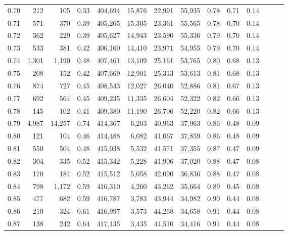 \begin{tabular}{rrrrrrrrrrrrrr}
0.70 &     212 &     105 &  0.33 &  404,694 &   15,876 &  22,991 &  55,935 &  0.78 &  0.71 &      0.14 \\
0.71 &     571 &     370 &  0.39 &  405,265 &   15,305 &  23,361 &  55,565 &  0.78 &  0.70 &      0.14 \\
0.72 &     362 &     229 &  0.39 &  405,627 &   14,943 &  23,590 &  55,336 &  0.79 &  0.70 &      0.14 \\
0.73 &     533 &     381 &  0.42 &  406,160 &   14,410 &  23,971 &  54,955 &  0.79 &  0.70 &      0.14 \\
0.74 &   1,301 &   1,190 &  0.48 &  407,461 &   13,109 &  25,161 &  53,765 &  0.80 &  0.68 &      0.13 \\
0.75 &     208 &     152 &  0.42 &  407,669 &   12,901 &  25,313 &  53,613 &  0.81 &  0.68 &      0.13 \\
0.76 &     874 &     727 &  0.45 &  408,543 &   12,027 &  26,040 &  52,886 &  0.81 &  0.67 &      0.13 \\
0.77 &     692 &     564 &  0.45 &  409,235 &   11,335 &  26,604 &  52,322 &  0.82 &  0.66 &      0.13 \\
0.78 &     145 &     102 &  0.41 &  409,380 &   11,190 &  26,706 &  52,220 &  0.82 &  0.66 &      0.13 \\
0.79 &   4,987 &  14,257 &  0.74 &  414,367 &    6,203 &  40,963 &  37,963 &  0.86 &  0.48 &      0.09 \\
0.80 &     121 &     104 &  0.46 &  414,488 &    6,082 &  41,067 &  37,859 &  0.86 &  0.48 &      0.09 \\
0.81 &     550 &     504 &  0.48 &  415,038 &    5,532 &  41,571 &  37,355 &  0.87 &  0.47 &      0.09 \\
0.82 &     304 &     335 &  0.52 &  415,342 &    5,228 &  41,906 &  37,020 &  0.88 &  0.47 &      0.08 \\
0.83 &     170 &     184 &  0.52 &  415,512 &    5,058 &  42,090 &  36,836 &  0.88 &  0.47 &      0.08 \\
0.84 &     798 &   1,172 &  0.59 &  416,310 &    4,260 &  43,262 &  35,664 &  0.89 &  0.45 &      0.08 \\
0.85 &     477 &     682 &  0.59 &  416,787 &    3,783 &  43,944 &  34,982 &  0.90 &  0.44 &      0.08 \\
0.86 &     210 &     324 &  0.61 &  416,997 &    3,573 &  44,268 &  34,658 &  0.91 &  0.44 &      0.08 \\
0.87 &     138 &     242 &  0.64 &  417,135 &    3,435 &  44,510 &  34,416 &  0.91 &  0.44 &      0.08 \\

\end{tabular}
